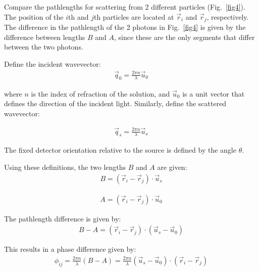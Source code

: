 \documentclass[book.tex]{subfiles}
\begin{document}
Compare the pathlengths for scattering from 2 different particles (Fig.~\ref{fig4}). The position of the $i$th and $j$th particles are located at $\vec{r}_i$ and $\vec{r}_j$, respectively. The difference in the pathlength of the 2 photons in Fig.~\ref{fig4} is given by the difference between lengths $B$ and $A$, since these are the only segments that differ between the two photons.

Define the incident wavevector:
\begin{align}\label{Eq7}
\vec{q}_0 = \frac{2\pi n}{\lambda}\vec{u}_0
\end{align}

\noindent where $n$ is the index of refraction of the solution, and $\vec{u}_0$ is a unit vector that defines the direction of the incident light. Similarly, define
the scattered wavevector:

\begin{align}\label{Eq8}
\vec{q}_s = \frac{2\pi n}{\lambda}\vec{u}_s
\end{align}

The fixed detector orientation relative to the source is defined by the angle $\theta$.

Using these definitions, the two lengths $B$ and $A$ are given:
\begin{align}\label{Eq9}
B = (\vec{r}_i - \vec{r}_j)\cdot \vec{u}_s
\end{align}

\begin{marginfigure}
\caption{Schematic showing the difference between pathlengths for
photons scattering from different particles located at $\vec{r}_i$ and $\vec{r}_j$.}
\label{fig4}
\end{marginfigure}

\begin{align}\label{Eq10}
A = (\vec{r}_i - \vec{r}_j)\cdot \vec{u}_0
\end{align}

The pathlength difference is given by:
\begin{align}\label{Eq11}
B - A = (\vec{r}_i - \vec{r}_j)\cdot (\vec{u}_s - \vec{u}_0)
\end{align}

This results in a phase difference given by:
\begin{align}\label{Eq12}
\phi_{ij} = \frac{2\pi n}{\lambda}(B - A) = \frac{2\pi n}{\lambda}(\vec{u}_s - \vec{u}_0) \cdot (\vec{r}_i - \vec{r}_j)
\end{align}
\end{document}
